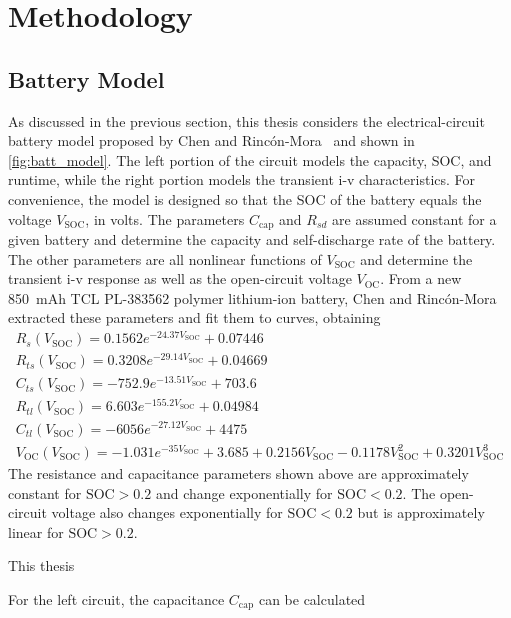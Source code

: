 \chapter{Methodology}


\section{Battery Model}

As discussed in the previous section, this thesis considers the electrical-circuit battery model proposed by Chen and Rinc\'on-Mora~\cite{chen06} and shown in \autoref{fig:batt_model}. The left portion of the circuit models the capacity, SOC, and runtime, while the right portion models the transient i-v characteristics.  For convenience, the model is designed so that the SOC of the battery equals the voltage $V_\text{SOC}$, in volts. The parameters $C_\text{cap}$ and $R_{sd}$ are assumed constant
for a given battery and determine the capacity and self-discharge rate of the battery. The other parameters are all nonlinear functions of $V_\text{SOC}$ and determine the transient i-v response as well as the open-circuit voltage $V_\text{OC}$. From a new 850~mAh TCL PL-383562 polymer lithium-ion battery, Chen and Rinc\'on-Mora extracted these parameters and fit them to curves, obtaining
\begin{gather}
	R_s(V_\text{SOC}) = 0.1562 e^{-24.37 V_\text{SOC}} + 0.07446 \\
	R_{ts}(V_\text{SOC}) = 0.3208 e^{-29.14 V_\text{SOC}} + 0.04669 \\
	C_{ts}(V_\text{SOC}) = -752.9 e^{-13.51 V_\text{SOC}} + 703.6 \\
	R_{tl}(V_\text{SOC}) = 6.603 e^{-155.2 V_\text{SOC}} + 0.04984 \\
	C_{tl}(V_\text{SOC}) = -6056 e^{-27.12 V_\text{SOC}} + 4475 \\
	V_\text{OC}(V_\text{SOC}) = -1.031 e^{-35 V_\text{SOC}} + 3.685 + 0.2156 V_\text{SOC} - 0.1178 V_\text{SOC}^2 + 0.3201 V_\text{SOC}^3
\end{gather}
The resistance and capacitance parameters shown above are approximately constant for $\text{SOC}>0.2$ and change exponentially for $\text{SOC}<0.2$. The open-circuit voltage also changes exponentially for $\text{SOC}<0.2$ but is approximately linear for $\text{SOC}>0.2$.

This thesis 

For the left circuit, the capacitance $C_\text{cap}$ can be calculated 

